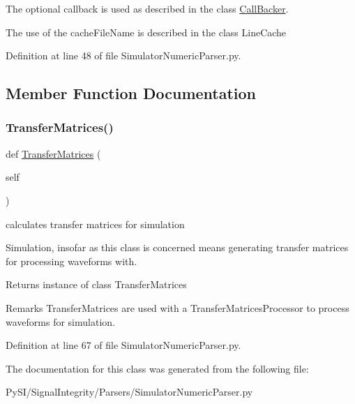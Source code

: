 The optional callback is used as described in the class \hyperlink{namespaceSignalIntegrity_1_1CallBacker}{Call\+Backer}.

The use of the cache\+File\+Name is described in the class Line\+Cache 

Definition at line 48 of file Simulator\+Numeric\+Parser.\+py.



\subsection{Member Function Documentation}
\mbox{\label{classSignalIntegrity_1_1Parsers_1_1SimulatorNumericParser_1_1SimulatorNumericParser_a836e87421e9e21a6676da06625b644b1}} 
\subsubsection{\texorpdfstring{Transfer\+Matrices()}{TransferMatrices()}}
{\footnotesize\ttfamily def \hyperlink{classSignalIntegrity_1_1FrequencyDomain_1_1TransferMatrices_1_1TransferMatrices}{Transfer\+Matrices} (\begin{DoxyParamCaption}\item[{}]{self }\end{DoxyParamCaption})}



calculates transfer matrices for simulation 

Simulation, insofar as this class is concerned means generating transfer matrices for processing waveforms with.

\begin{DoxyReturn}{Returns}
instance of class Transfer\+Matrices
\end{DoxyReturn}
\begin{DoxyRemark}{Remarks}
Transfer\+Matrices are used with a Transfer\+Matrices\+Processor to process waveforms for simulation. 
\end{DoxyRemark}


Definition at line 67 of file Simulator\+Numeric\+Parser.\+py.



The documentation for this class was generated from the following file\+:\begin{DoxyCompactItemize}
\item 
Py\+S\+I/\+Signal\+Integrity/\+Parsers/Simulator\+Numeric\+Parser.\+py\end{DoxyCompactItemize}
